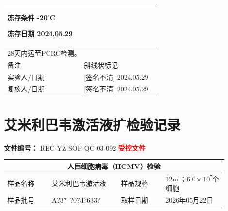 \documentclass[UTF8,10pt,a4paper,fontset=fandol]{ctexart}
\newcommand{\fieldvalue}[1]{#1}
\newcommand{\handwritten}[1]{#1}
\begin{document}
\begin{tabular}{|p{0.47\linewidth}|p{0.47\linewidth}|}
冻存条件
\fieldvalue{\handwritten{-20}}$^\circ$C

冻存日期
\fieldvalue{\handwritten{2024.05.29}}
\\
\hline
\multicolumn{2}{|l|}{28天内运至PCRC检测。}\\
\hline
备注
&
\fieldvalue{\handwritten{斜线状标记}}
\\
\hline
实验人/日期
&
\fieldvalue{\handwritten{[签名不清]}}
\quad
\fieldvalue{\handwritten{2024.05.29}}
\\
\hline
复核人/日期
&
\fieldvalue{\handwritten{[签名不清]}}
\quad
\fieldvalue{\handwritten{2024.05.29}}
\\
\hline
\end{tabular}

\newpage

\section*{艾米利巴韦激活液扩检验记录}

\noindent
\textbf{文件编号：} REC-YZ-SOP-QC-03-092 \hfill
\textcolor{red}{\textbf{受控文件}}

\begin{center}
\begin{tabular}{|p{0.18\linewidth}|p{0.29\linewidth}|p{0.18\linewidth}|p{0.25\linewidth}|}
\hline
\multicolumn{4}{|c|}{人巨细胞病毒（HCMV）检验}\\
\hline
样品名称 &
\fieldvalue{艾米利巴韦激活液} &
样品规格 &
\fieldvalue{12ml；$6.0\times10^7$个细胞}\\
\hline
样品批号 &
\fieldvalue{\handwritten{A?3?--?0?d?633?}} &
取样日期 &
\fieldvalue{\handwritten{2026年05月22日}}\\
\hline
\end{tabular}
\end{center}
\end{document}
